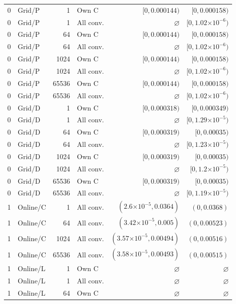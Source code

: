 \begin{longtable}{llrlrr}
0 & Grid/P & 1 & Own C & $[0, 0.000144)$ & $[0, 0.000158)$ \\
0 & Grid/P & 1 & All conv. & $\varnothing$ & $[0, 1.02\mathord{\times}10^{-6})$ \\
0 & Grid/P & 64 & Own C & $[0, 0.000144)$ & $[0, 0.000158)$ \\
0 & Grid/P & 64 & All conv. & $\varnothing$ & $[0, 1.02\mathord{\times}10^{-6})$ \\
0 & Grid/P & 1024 & Own C & $[0, 0.000144)$ & $[0, 0.000158)$ \\
0 & Grid/P & 1024 & All conv. & $\varnothing$ & $[0, 1.02\mathord{\times}10^{-6})$ \\
0 & Grid/P & 65536 & Own C & $[0, 0.000144)$ & $[0, 0.000158)$ \\
0 & Grid/P & 65536 & All conv. & $\varnothing$ & $[0, 1.02\mathord{\times}10^{-6})$ \\
0 & Grid/D & 1 & Own C & $[0, 0.000318)$ & $[0, 0.000349)$ \\
0 & Grid/D & 1 & All conv. & $\varnothing$ & $[0, 1.29\mathord{\times}10^{-5})$ \\
0 & Grid/D & 64 & Own C & $[0, 0.000319)$ & $[0, 0.00035)$ \\
0 & Grid/D & 64 & All conv. & $\varnothing$ & $[0, 1.23\mathord{\times}10^{-5})$ \\
0 & Grid/D & 1024 & Own C & $[0, 0.000319)$ & $[0, 0.00035)$ \\
0 & Grid/D & 1024 & All conv. & $\varnothing$ & $[0, 1.2\mathord{\times}10^{-5})$ \\
0 & Grid/D & 65536 & Own C & $[0, 0.000319)$ & $[0, 0.00035)$ \\
0 & Grid/D & 65536 & All conv. & $\varnothing$ & $[0, 1.19\mathord{\times}10^{-5})$ \\
1 & Online/C & 1 & All conv. & $(2.6\mathord{\times}10^{-5}, 0.0364)$ & $(0, 0.0368)$ \\
1 & Online/C & 64 & All conv. & $(3.42\mathord{\times}10^{-5}, 0.005)$ & $(0, 0.00523)$ \\
1 & Online/C & 1024 & All conv. & $(3.57\mathord{\times}10^{-5}, 0.00494)$ & $(0, 0.00516)$ \\
1 & Online/C & 65536 & All conv. & $(3.58\mathord{\times}10^{-5}, 0.00493)$ & $(0, 0.00515)$ \\
1 & Online/L & 1 & Own C & $\varnothing$ & $\varnothing$ \\
1 & Online/L & 1 & All conv. & $\varnothing$ & $\varnothing$ \\
1 & Online/L & 64 & Own C & $\varnothing$ & $\varnothing$ \\

\end{longtable}

